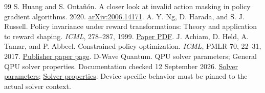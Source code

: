 \begin{thebibliography}{99}
 S. Huang and S. Onta\~n\'on. A closer look at invalid action masking in policy gradient algorithms. 2020. \href{https://arxiv.org/abs/2006.14171}{arXiv:2006.14171}.
 A. Y. Ng, D. Harada, and S. J. Russell. Policy invariance under reward transformations: Theory and application to reward shaping. \emph{ICML}, 278--287, 1999. \href{https://luthuli.cs.uiuc.edu/~daf/courses/Games/AIpapers/ml99-shaping.pdf}{Paper PDF}.
 J. Achiam, D. Held, A. Tamar, and P. Abbeel. Constrained policy optimization. \emph{ICML}, PMLR 70, 22--31, 2017. \href{https://proceedings.mlr.press/v70/achiam17a.html}{Publisher paper page}.
 D-Wave Quantum. QPU solver parameters; General QPU solver properties. Documentation checked 12 September 2026. \href{https://docs.dwavequantum.com/en/latest/quantum_research/solver_parameters.html}{Solver parameters}; \href{https://docs.dwavequantum.com/en/latest/quantum_research/solver_properties_all.html}{Solver properties}. Device-specific behavior must be pinned to the actual solver context.
\end{thebibliography}

